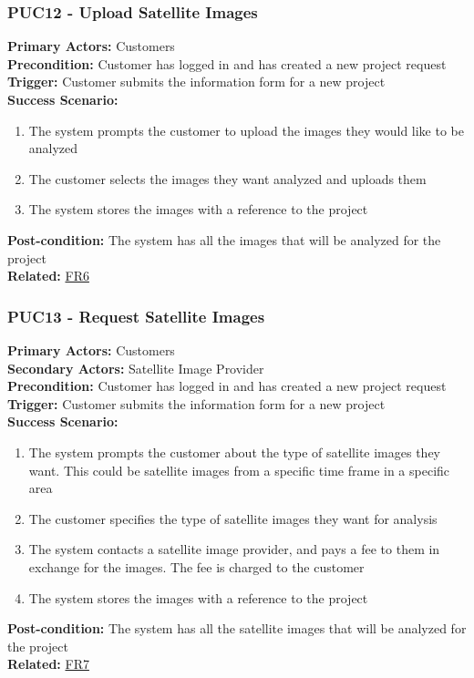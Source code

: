 \documentclass[12pt]{article}
\begin{document}
\subsubsection*{PUC12 - Upload Satellite Images}
\label{sec:PUC12}
\textbf{Primary Actors:} Customers\\
\textbf{Precondition:} Customer has logged in and has created a new project request\\
\textbf{Trigger:} Customer submits the information form for a new project\\
\textbf{Success Scenario:}
\begin{enumerate}
    \item The system prompts the customer to upload the images they would like to be analyzed
    \item The customer selects the images they want analyzed and uploads them
    \item The system stores the images with a reference to the project
\end{enumerate}
\textbf{Post-condition:} The system has all the images that will be analyzed for the project\\
\textbf{Related:} \hyperref[sec:FR6]{FR6}

\subsubsection*{PUC13 - Request Satellite Images}
\label{sec:PUC13}
\textbf{Primary Actors:} Customers\\
\textbf{Secondary Actors:} Satellite Image Provider\\
\textbf{Precondition:} Customer has logged in and has created a new project request\\
\textbf{Trigger:} Customer submits the information form for a new project\\
\textbf{Success Scenario:}
\begin{enumerate}
    \item The system prompts the customer about the type of satellite images they want. This could be satellite images from a specific time frame in a specific area
    \item The customer specifies the type of satellite images they want for analysis
    \item The system contacts a satellite image provider, and pays a fee to them in exchange for the images. The fee is charged to the customer
    \item The system stores the images with a reference to the project
\end{enumerate}
\textbf{Post-condition:} The system has all the satellite images that will be analyzed for the project\\
\textbf{Related:} \hyperref[sec:FR7]{FR7}
\end{document}

